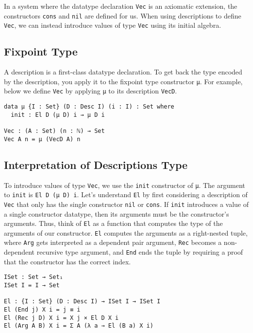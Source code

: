 \documentclass[preprint,nonatbib]{sigplanconf}
\begin{document}
In a system where the datatype declaration {\tt Vec} is an axiomatic
extension, the constructors {\tt cons} and {\tt nil} are defined for
us. When using descriptions to define {\tt Vec}, we can instead
introduce values of type {\tt Vec} using its initial algebra.

\subsection{Fixpoint Type}

A description is a first-class datatype declaration. To get back the
type encoded by the description, you apply it to the fixpoint type
constructor {\tt μ}. For example, below we define {\tt Vec} by
applying {\tt μ} to its description {\tt VecD}.

\begin{verbatim}
data μ {I : Set} (D : Desc I) (i : I) : Set where
  init : El D (μ D) i → μ D i

Vec : (A : Set) (n : ℕ) → Set
Vec A n = μ (VecD A) n
\end{verbatim}

\subsection{Interpretation of Descriptions Type}
\label{sec:init:el}

To introduce values of type {\tt Vec}, we use the
{\tt init} constructor of {\tt μ}. The argument to {\tt init} is
{\tt El D (μ D) i}. Let's understand {\tt El} by first considering a
description of {\tt Vec} that only has the single constructor
{\tt nil} or {\tt cons}. If {\tt init} introduces
a value of a single constructor datatype, then its arguments must be
the constructor's arguments. Thus, think of
{\tt El} as a function that computes the type of the arguments of our
constructor. {\tt El} computes the arguments as a right-nested tuple,
where {\tt Arg} gets interpreted as a dependent pair argument,
{\tt Rec} becomes a non-dependent recursive type argument, and
{\tt End} ends the tuple by requiring a proof that the constructor has
the correct index.

\begin{verbatim}
ISet : Set → Set₁
ISet I = I → Set

El : {I : Set} (D : Desc I) → ISet I → ISet I
El (End j) X i = j ≡ i
El (Rec j D) X i = X j × El D X i
El (Arg A B) X i = Σ A (λ a → El (B a) X i)
\end{verbatim}
\end{document}
